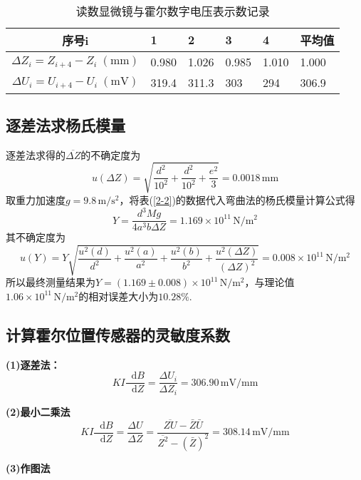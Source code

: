 \documentclass[UTF-8,twoside,cs4size]{ctexart}
\newcommand*{\dif}{\mathop{}\!\mathrm{d}}
\begin{document}
\begin{table}[!h]
	~\\
	
		\begin{tabularx}{\textwidth}{|c|Y|Y|Y|Y|Y|}
			\hline
			\textbf{序号$ \bm i $}&\textbf{1}&\textbf{2}&\textbf{3}&\textbf{4}&\textbf{平均值}\\
			\hline
			$ \Delta Z_i=Z_{i+4}-Z_i\;\mathrm{(mm)} $&0.980&1.026&0.985&1.010&1.000\\
			\hline
			$ \Delta U_i=U_{i+4}-U_i\;\mathrm{(mV)} $&319.4&311.3&303&294&306.9\\
			\hline
		\end{tabularx}
		\caption{读数显微镜与霍尔数字电压表示数记录}
		\label{tab2-2}
	\end{table}

	\subsection{逐差法求杨氏模量}
	逐差法求得的$ \overline{\Delta Z} $的不确定度为
	\[u(\Delta Z)=\sqrt{\frac{d^2}{10^2}+\frac{d^2}{10^2}+\frac{e^2}{3}}=0.0018\,\mathrm{mm}\]
	取重力加速度$ g=9.8\,\mathrm{m/s^2} $，将表(\ref{2-2})的数据代入弯曲法的杨氏模量计算公式得
	\[Y=\frac{d^3Mg}{4a^3b\Delta Z}=1.169\times10^{11}\,\mathrm{N/m^2}\]
	其不确定度为
	\[u(Y)=Y\sqrt{\frac{u^2(d)}{d^2}+\frac{u^2(a)}{a^2}+\frac{u^2(b)}{b^2}+\frac{u^2(\Delta Z)}{(\Delta Z)^2}}=0.008\times10^{11}\,\mathrm{N/m^2}\]
	所以最终测量结果为$ Y=(1.169\pm 0.008)\times10^{11}\,\mathrm{N/m^2} $，与理论值$ 1.06\times10^{11}\,\mathrm{N/m^2} $的相对误差大小为$ 10.28\% $.
	
	\subsection{计算霍尔位置传感器的灵敏度系数}
	\textbf{(1)逐差法：}
	\[KI\frac{\dif B}{\dif Z}=\frac{\Delta U_i}{\Delta Z_i}=306.90\,\mathrm{mV/mm}\]
	
	\textbf{(2)最小二乘法}
	\[KI\frac{\dif B}{\dif Z}=\frac{\Delta U}{\Delta Z}=\frac{\overline{ZU}-\bar Z\bar U}{\overline{Z^2}-(\bar Z)^2}=308.14\,\mathrm{mV/mm}\]
	
	\textbf{(3)作图法}
	
\end{document}
